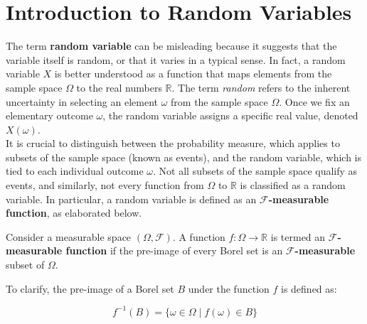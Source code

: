 \section{Introduction to Random Variables}

The term \textbf{random variable} can be misleading because it suggests that the variable itself is random, or that it varies in a typical sense. In fact, a random variable \( X \) is better understood as a function that maps elements from the sample space \( \Omega \) to the real numbers \( \mathbb{R} \). The term \textit{random} refers to the inherent uncertainty in selecting an element \( \omega \) from the sample space \( \Omega \). Once we fix an elementary outcome \( \omega \), the random variable assigns a specific real value, denoted \( X(\omega) \).\\

It is crucial to distinguish between the probability measure, which applies to subsets of the sample space (known as events), and the random variable, which is tied to each individual outcome \( \omega \). Not all subsets of the sample space qualify as events, and similarly, not every function from \( \Omega \) to \( \mathbb{R} \) is classified as a random variable. In particular, a random variable is defined as an \textbf{$\mathcal{F}$-measurable function}, as elaborated below.

\begin{definition}
    Consider a measurable space \( (\Omega, \mathcal{F}) \). A function \( f: \Omega \to \mathbb{R} \) is termed an \textbf{$\mathcal{F}$-measurable function} if the pre-image of every Borel set is an \textbf{$\mathcal{F}$-measurable} subset of \( \Omega \).
\end{definition}

To clarify, the pre-image of a Borel set \( B \) under the function \( f \) is defined as:

\[
f^{-1}(B) = \{ \omega \in \Omega \mid f(\omega) \in B \} 
\]


